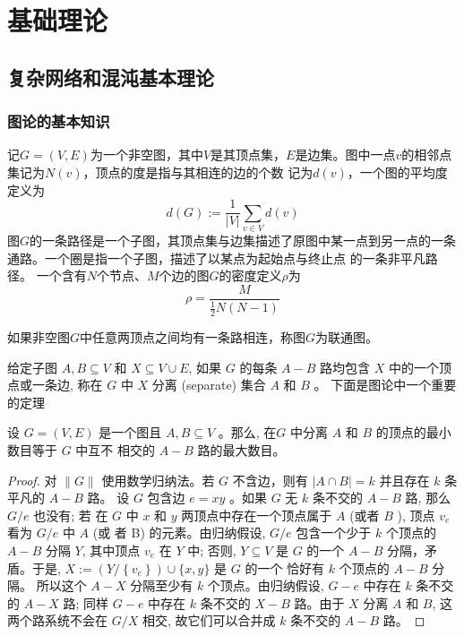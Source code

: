 \chapter{基础理论}
\section{复杂网络和混沌基本理论}
\subsection{图论的基本知识}
记$G=(V,E)$为一个非空图，其中$V$是其顶点集，$E$是边集。图中一点$v$的相邻点集记为$N(v)$，顶点的度是指与其相连的边的个数
记为$d(v)$，一个图的平均度定义为
\begin{equation}
    d(G):=\frac{1}{|V|} \sum_{v \in V} d(v)
\end{equation}
图$G$的一条路径是一个子图，其顶点集与边集描述了原图中某一点到另一点的一条通路。一个圈是指一个子图，描述了以某点为起始点与终止点
的一条非平凡路径。
一个含有$N$个节点、$M$个边的图$G$的密度定义$\rho$为
\begin{equation}
    \rho=\frac{M}{\frac{1}{2} N(N-1)}
\end{equation}
\begin{definition}
    如果非空图$G$中任意两顶点之间均有一条路相连，称图$G$为联通图。
\end{definition}
给定子图 $A, B \subseteq V$ 和 $X \subseteq V \cup E$, 如果 $G$ 的每条 $A-B$ 路均包含 $X$ 中的一个顶点或一条边,
称在 $G$ 中 $X$ 分离 (separate) 集合 $A$ 和 $B$ 。
下面是图论中一个重要的定理
\begin{theorem}
    设 $G=(V, E)$ 是一个图且 $A, B \subseteq V$ 。那么, 在$G$ 中分离 $A$ 和 $B$ 的顶点的最小数目等于 $G$ 中互不
    相交的 $A-B$ 路的最大数目。
\end{theorem}
\begin{proof}
    对 $\|G\|$ 使用数学归纳法。若 $G$ 不含边，则有 $|A \cap B|=k$ 并且存在 $k$ 条平凡的 $A-B$ 路。 
    设 $G$ 包含边 $e=x y$ 。如果 $G$ 无 $k$ 条不交的 $A-B$ 路, 那么 $G / e$ 也没有; 
    若 在 $G$ 中 $x$ 和 $y$ 两顶点中存在一个顶点属于 $A$ (或者 $B$ ), 顶点 $v_e$ 
    看为 $G / e$ 中 $A$ (或 者 B) 的元素。由归纳假设, $G / e$ 包含一个少于 $k$ 个顶点的 $A-B$ 分隔 $Y$,
     其中顶点 $v_e$ 在 $Y$ 中; 否则, $Y \subseteq V$ 是 $G$ 的一个 $A-B$ 分隔，矛盾。于是,
     $X:=\left(Y /\left\{v_e\right\}\right) \cup\{x, y\}$ 是 $G$ 的一个 恰好有 $k$ 个顶点的 $A-B$ 分隔。
      所以这个 $A-X$ 分隔至少有 $k$ 个顶点。由归纳假设, $G-e$ 中存在 $k$ 条不交的 $A-X$ 路; 
      同样 $G-e$ 中存在 $k$ 条不交的 $X-B$ 路。由于 $X$ 分离 $A$ 和 $B$, 这两个路系统不会在 $G/ X$ 相交, 
      故它们可以合并成 $k$ 条不交的 $A-B$ 路。
\end{proof}
